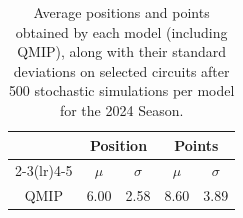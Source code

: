\begin{table}[H]
\centering
\begin{tabular}{ccccc}
\toprule
\multicolumn{1}{l}{}               & \multicolumn{2}{c}{Position}   & \multicolumn{2}{c}{Points} \\ \cmidrule(lr){2-3}\cmidrule(lr){4-5}
\multicolumn{1}{c}{Model}          &    $\mu$ & $\sigma$ &   $\mu$  & $\sigma$ \\ \midrule
\multicolumn{1}{c}{QMIP          } &     6.00  &     2.58  &     8.60  &     3.89  \\
\bottomrule
\end{tabular}
\caption{Average positions and points obtained by each model (including QMIP), along with their standard deviations on selected circuits after 500 stochastic simulations per model for the 2024 Season.}
\label{tab:tab_qmip_vs_drl_stochastic_2024}
\end{table}